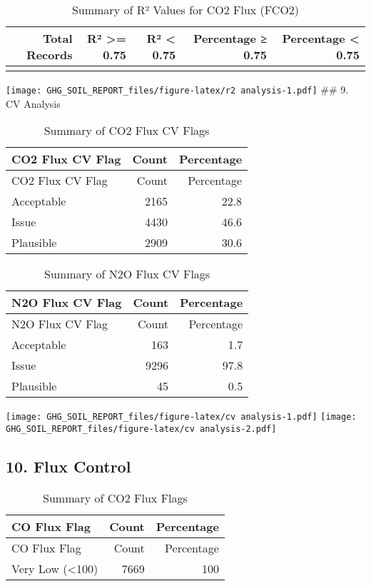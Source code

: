 \documentclass[
]{article}
\begin{document}
\begin{longtable}[t]{rrrrr}
\caption{\label{tab:r2 analysis}Summary of R² Values for CO2 Flux (FCO2)}\\
\toprule
Total Records & R² >= 0.75 & R² < 0.75 & Percentage ≥ 0.75 & Percentage < 0.75\\
\midrule
\cellcolor{gray!10}{9504} & \cellcolor{gray!10}{7669} & \cellcolor{gray!10}{1835} & \cellcolor{gray!10}{80.7} & \cellcolor{gray!10}{19.3}\\
\bottomrule
\end{longtable}

\texttt{[image: GHG\_SOIL\_REPORT\_files/figure-latex/r2 analysis-1.pdf]}
\#\# 9. CV Analysis

\begin{longtable}[]{@{}lrr@{}}
\caption{Summary of CO2 Flux CV Flags}\tabularnewline
\toprule()
CO2 Flux CV Flag & Count & Percentage \\
\midrule()
\endfirsthead
\toprule()
CO2 Flux CV Flag & Count & Percentage \\
\midrule()
\endhead
Acceptable & 2165 & 22.8 \\
Issue & 4430 & 46.6 \\
Plausible & 2909 & 30.6 \\
\bottomrule()
\end{longtable}

\begin{longtable}[]{@{}lrr@{}}
\caption{Summary of N2O Flux CV Flags}\tabularnewline
\toprule()
N2O Flux CV Flag & Count & Percentage \\
\midrule()
\endfirsthead
\toprule()
N2O Flux CV Flag & Count & Percentage \\
\midrule()
\endhead
Acceptable & 163 & 1.7 \\
Issue & 9296 & 97.8 \\
Plausible & 45 & 0.5 \\
\bottomrule()
\end{longtable}

\texttt{[image: GHG\_SOIL\_REPORT\_files/figure-latex/cv analysis-1.pdf]}
\texttt{[image: GHG\_SOIL\_REPORT\_files/figure-latex/cv analysis-2.pdf]}

\hypertarget{flux-control}{%
\subsection{10. Flux Control}\label{flux-control}}

\begin{longtable}[]{@{}lrr@{}}
\caption{Summary of CO2 Flux Flags}\tabularnewline
\toprule()
CO Flux Flag & Count & Percentage \\
\midrule()
\endfirsthead
\toprule()
CO Flux Flag & Count & Percentage \\
\midrule()
\endhead
Very Low (\textless100) & 7669 & 100 \\
\bottomrule()
\end{longtable}
\end{document}
